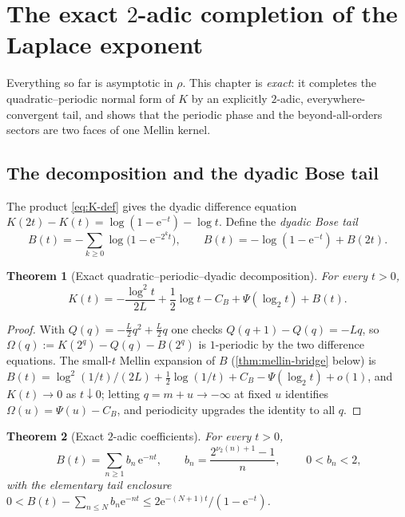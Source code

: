 \documentclass[11pt,oneside]{article}
\numberwithin{equation}{section}
\newtheorem{theorem}{Theorem}[section]
\theoremstyle{definition}
\theoremstyle{remark}
\newcommand{\e}{\mathrm e}
\newcommand{\smallo}{o}
\newcommand{\vtwo}{\nu_2}
\newcommand{\CB}{C_{B}}
\begin{document}
\section{The exact \texorpdfstring{$2$}{2}-adic completion of the
Laplace exponent}
\label{sec:dyadic-completion}

Everything so far is asymptotic in $\rho$.  This chapter is
\emph{exact}: it completes the quadratic--periodic normal form of
$K$ by an explicitly $2$-adic, everywhere-convergent tail, and shows
that the periodic phase and the beyond-all-orders sectors are two
faces of one Mellin kernel.

\subsection{The decomposition and the dyadic Bose tail}

The product \eqref{eq:K-def} gives the dyadic difference equation
$K(2t)-K(t)=\log(1-\e^{-t})-\log t$.  Define the \emph{dyadic Bose
tail}
\begin{equation}
 B(t)=-\sum_{k\ge0}\log\bigl(1-\e^{-2^{k}t}\bigr),
 \qquad
 B(t)=-\log(1-\e^{-t})+B(2t).
 \label{eq:B-def}
\end{equation}

\begin{theorem}[Exact quadratic--periodic--dyadic decomposition]
\label{thm:K-decomposition}
For every $t>0$,
\begin{equation}
 \boxed{\;
 K(t)=-\frac{\log^{2}t}{2L}+\frac12\log t-\CB
 +\Psi(\log_2t)+B(t).
 \;}
 \label{eq:K-decomposition}
\end{equation}
\end{theorem}

\begin{proof}
With $Q(q)=-\tfrac L2q^{2}+\tfrac L2q$ one checks
$Q(q+1)-Q(q)=-Lq$, so
$\Omega(q):=K(2^{q})-Q(q)-B(2^{q})$ is $1$-periodic by the two
difference equations.  The small-$t$ Mellin expansion of $B$
(\cref{thm:mellin-bridge} below) is
$B(t)=\log^{2}(1/t)/(2L)+\tfrac12\log(1/t)+\CB-\Psi(\log_2t)+
\smallo(1)$, and $K(t)\to0$ as $t\downarrow0$; letting
$q=m+u\to-\infty$ at fixed $u$ identifies
$\Omega(u)=\Psi(u)-\CB$, and periodicity upgrades the identity to
all $q$.
\end{proof}

\begin{theorem}[Exact $2$-adic coefficients]
\label{thm:B-2adic}
For every $t>0$,
\begin{equation}
 \boxed{\;
 B(t)=\sum_{n\ge1}b_n\,\e^{-nt},
 \qquad
 b_n=\frac{2^{\vtwo(n)+1}-1}{n},
 \;}
 \qquad
 0<b_n<2,
 \label{eq:B-2adic}
\end{equation}
with the elementary tail enclosure
$0<B(t)-\sum_{n\le N}b_n\e^{-nt}\le2\e^{-(N+1)t}/(1-\e^{-t})$.
\end{theorem}
\end{document}
